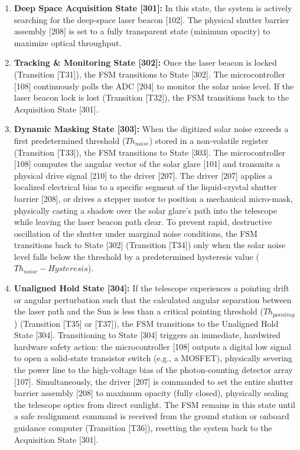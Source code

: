 \documentclass[12pt,a4paper]{article}
\begin{document}
\begin{enumerate}
  \item \textbf{Deep Space Acquisition State [301]:} In this state, the system is actively searching for the deep-space laser beacon [102]. The physical shutter barrier assembly [208] is set to a fully transparent state (minimum opacity) to maximize optical throughput.
  \item \textbf{Tracking \& Monitoring State [302]:} Once the laser beacon is locked (Transition [T31]), the FSM transitions to State [302]. The microcontroller [108] continuously polls the ADC [204] to monitor the solar noise level. If the laser beacon lock is lost (Transition [T32]), the FSM transitions back to the Acquisition State [301].
  \item \textbf{Dynamic Masking State [303]:} When the digitized solar noise exceeds a first predetermined threshold ($Th_{noise}$) stored in a non-volatile register (Transition [T33]), the FSM transitions to State [303]. The microcontroller [108] computes the angular vector of the solar glare [101] and transmits a physical drive signal [210] to the driver [207]. The driver [207] applies a localized electrical bias to a specific segment of the liquid-crystal shutter barrier [208], or drives a stepper motor to position a mechanical micro-mask, physically casting a shadow over the solar glare's path into the telescope while leaving the laser beacon path clear. To prevent rapid, destructive oscillation of the shutter under marginal noise conditions, the FSM transitions back to State [302] (Transition [T34]) only when the solar noise level falls below the threshold by a predetermined hysteresis value ($Th_{noise} - Hysteresis$).
  \item \textbf{Unaligned Hold State [304]:} If the telescope experiences a pointing drift or angular perturbation such that the calculated angular separation between the laser path and the Sun is less than a critical pointing threshold ($Th_{pointing}$) (Transition [T35] or [T37]), the FSM transitions to the Unaligned Hold State [304]. Transitioning to State [304] triggers an immediate, hardwired hardware safety action: the microcontroller [108] outputs a digital low signal to open a solid-state transistor switch (e.g., a MOSFET), physically severing the power line to the high-voltage bias of the photon-counting detector array [107]. Simultaneously, the driver [207] is commanded to set the entire shutter barrier assembly [208] to maximum opacity (fully closed), physically sealing the telescope optics from direct sunlight. The FSM remains in this state until a safe realignment command is received from the ground station or onboard guidance computer (Transition [T36]), resetting the system back to the Acquisition State [301].
\end{enumerate}
\end{document}
